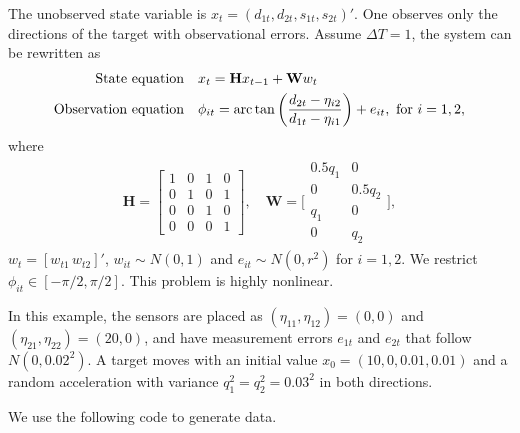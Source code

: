 The unobserved state variable is $x_t=(d_{1t},d_{2t},s_{1t},s_{2t})'$. One observes only the directions of the target with observational errors. Assume $\Delta T=1$, the system can be rewritten as
\begin{align}
\mbox{State equation}&\quad  x_t=\mathbf{H} x_{t-1} +\mathbf{W} w_t \label{state_eq}\\
\mbox{Observation equation} & \quad \phi_{it}={\rm arc} \, {\rm tan} \left(\frac{d_{2t}-\eta_{i2}}{d_{1t}-\eta_{i1}} \right)+e_{it}, \mbox{ for } i=1,2,
\end{align}
where 
\begin{align*}
\mathbf{H}=\left[
\begin{array}{cccc}
1	&0	&1	&0\\
0	&1	&0	&1\\
0	&0	&1	&0\\
0	&0	&0	&1
\end{array}\right], \quad \mathbf{W}=\Bigg[
\begin{array}{cc}
0.5q_1 &0 	\\
0	&0.5q_2\\
q_1	&0\\
0	&q_2
\end{array}\Bigg],
\end{align*}
$w_t=[w_{t1}\, w_{t2}]'$, $w_{it} \sim N(0,1)$ and $e_{it} \sim N(0, r^2)$ for $i=1,2$. We restrict $\phi_{it} \in [-\pi/2, \pi/2]$. This problem is highly nonlinear.

In this example, the sensors are placed as $(\eta_{11},\eta_{12})=(0,0)$ and $(\eta_{21},\eta_{22})=(20,0)$, and have measurement errors $e_{1t}$ and $e_{2t}$ that follow $N(0,0.02^2)$. A target moves with an initial value $x_0=(10,0,0.01,0.01)$ and a random acceleration with variance $q_1^2=q_2^2=0.03^2$ in both directions. 

We use the following code to generate data.

